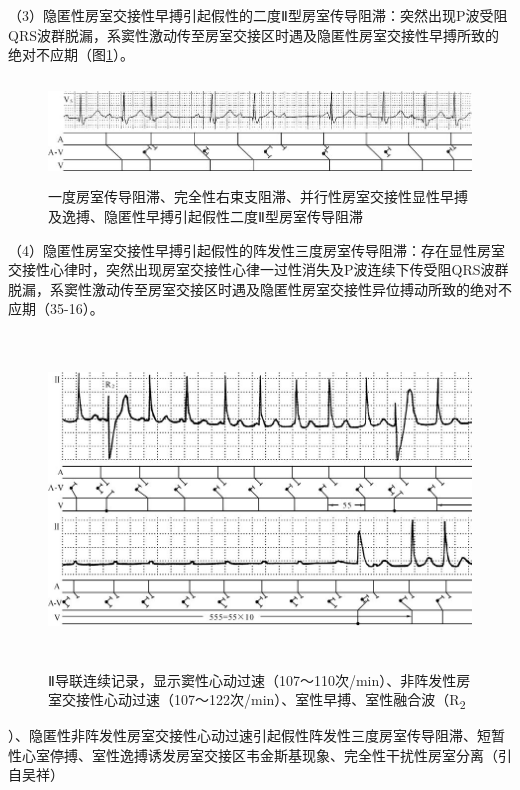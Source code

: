 （3）隐匿性房室交接性早搏引起假性的二度Ⅱ型房室传导阻滞：突然出现P波受阻QRS波群脱漏，系窦性激动传至房室交接区时遇及隐匿性房室交接性早搏所致的绝对不应期（图\ref{fig35-15}）。

\begin{figure}[!htbp]
 \centering
 \includegraphics[width=5.80208in,height=1.08333in]{./images/Image00568.jpg}
 \captionsetup{justification=centering}
 \caption{一度房室传导阻滞、完全性右束支阻滞、并行性房室交接性显性早搏及逸搏、隐匿性早搏引起假性二度Ⅱ型房室传导阻滞}
 \label{fig35-15}
  \end{figure} 

（4）隐匿性房室交接性早搏引起假性的阵发性三度房室传导阻滞：存在显性房室交接性心律时，突然出现房室交接性心律一过性消失及P波连续下传受阻QRS波群脱漏，系窦性激动传至房室交接区时遇及隐匿性房室交接性异位搏动所致的绝对不应期（35-16）。

\begin{figure}[!htbp]
 \centering
 \includegraphics[width=5.78125in,height=3.46875in]{./images/Image00569.jpg}
 \captionsetup{justification=centering}
 \caption{Ⅱ导联连续记录，显示窦性心动过速（107～110次/min）、非阵发性房室交接性心动过速（107～122次/min）、室性早搏、室性融合波（R\textsubscript{2}}
 \label{fig35-16}
  \end{figure} 
）、隐匿性非阵发性房室交接性心动过速引起假性阵发性三度房室传导阻滞、短暂性心室停搏、室性逸搏诱发房室交接区韦金斯基现象、完全性干扰性房室分离（引自吴祥）

